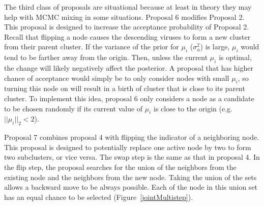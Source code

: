 \documentclass[11pt,oneside,letterpaper]{article}
\begin{document}
The third class of proposals are situational because at least in theory they may help with MCMC mixing in some situations.
Proposal 6 modifies Proposal 2. 
This proposal is designed to increase the acceptance probability of Proposal 2. 
Recall that flipping a node causes the descending viruses to form a new cluster from their parent cluster.
If the variance of the prior for $\mu_i$ ($\sigma^2_u$) is large, $\mu_i$ would tend to be farther away from the origin. 
Then, unless the current $\mu_i$ is optimal, the change will likely negatively affect the posterior.  
A proposal that has higher chance of acceptance would simply be to only consider nodes with small $\mu_i$, so turning this node on will result in a birth of cluster that is close to its parent cluster.
To implement this idea, proposal 6 only considers a node as a candidate to be chosen randomly if its current value of $\mu_i$ is close to the origin (e.g. $ || \mu_i ||_2  < 2$).


Proposal 7 combines proposal 4 with flipping the indicator of a neighboring node. 
This proposal is designed to potentially replace one active node by two to form two subclusters, or vice versa.
The swap step is the same as that in proposal 4.
In the flip step, the proposal searches for the union of the neighbors from the existing node and the neighbors from the new node.
Taking the union of the sets allows a backward move to be always possible.
Each of the node in this union set has an equal chance to be selected (Figure~\ref{jointMultistep}).



\end{document}
